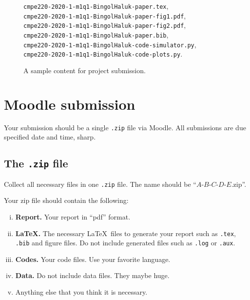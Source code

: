 \documentclass[11pt,a4,twocolumn]{article}
\newcommand{\hCode}[1]{\texttt{#1}}
\theoremstyle{plain}
\theoremstyle{definition}
\theoremstyle{remark}
\begin{document}
\begin{figure}[!tbp]
	\centering 
	\hCode{cmpe220-2020-1-m1q1-BingolHaluk-paper.tex},\\
	\hCode{cmpe220-2020-1-m1q1-BingolHaluk-paper-fig1.pdf},\\
	\hCode{cmpe220-2020-1-m1q1-BingolHaluk-paper-fig2.pdf},\\
	\hCode{cmpe220-2020-1-m1q1-BingolHaluk-paper.bib},\\
	\hCode{cmpe220-2020-1-m1q1-BingolHaluk-code-simulator.py},\\
	\hCode{cmpe220-2020-1-m1q1-BingolHaluk-code-plots.py}.
	\caption{
		A sample content for project submission.
	} 
	\label{fig:sampleContent}
\end{figure}




\section{Moodle submission}

Your submission should be a single \hCode{.zip} file via Moodle.
All submissions are due 
specified date and time, sharp.




\subsection{The \hCode{.zip} file}

Collect all necessary files in one \hCode{.zip} file.
The name should be ``$A$-$B$-$C$-$D$-$E$.zip''. 

Your zip file should contain the following:
\begin{enumerate}[i.]
	
	\item 
	\textbf{Report.}
	Your report in ``pdf'' format.
	
	\item
	\textbf{\LaTeX.}
	The necessary \LaTeX\ files to generate your report
	such as  
	\hCode{.tex}, 
	\hCode{.bib} and
	figure files.
	Do not include generated files such as \hCode{.log} or \hCode{.aux}.
		
	\item
	\textbf{Codes.}
	Your code files. 
	Use your favorite language.
	
	\item
	\textbf{Data.}
	Do not include data files.
	They maybe huge.
	
	\item
	Anything else that you think it is necessary.
	
\end{enumerate}
\end{document}
